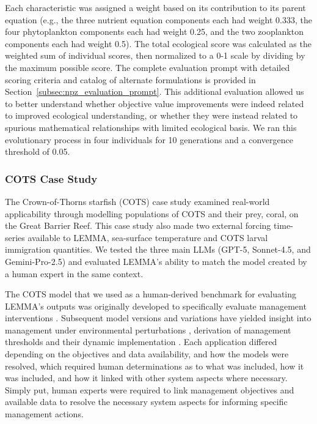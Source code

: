Each characteristic was assigned a weight based on its contribution to its parent equation (e.g., the three nutrient equation components each had weight 0.333, the four phytoplankton components each had weight 0.25, and the two zooplankton components each had weight 0.5). The total ecological score was calculated as the weighted sum of individual scores, then normalized to a 0-1 scale by dividing by the maximum possible score. The complete evaluation prompt with detailed scoring criteria and catalog of alternate formulations is provided in Section~\ref{subsec:npz_evaluation_prompt}. This additional evaluation allowed us to better understand whether objective value improvements were indeed related to improved ecological understanding, or whether they were instead related to spurious mathematical relationships with limited ecological basis. We ran this evolutionary process in four individuals for 10 generations and a convergence threshold of 0.05.

\subsubsection{COTS Case Study}

The Crown-of-Thorns starfish (COTS) case study examined real-world applicability through modelling populations of COTS and their prey, coral, on the Great Barrier Reef. This case study also made two external forcing time-series available to LEMMA, sea-surface temperature and COTS larval immigration quantities. We tested the three main LLMs (GPT-5, Sonnet-4.5, and Gemini-Pro-2.5) and evaluated LEMMA's ability to match the model created by a human expert in the same context.

The COTS model that we used as a human-derived benchmark for evaluating LEMMA's outputs was originally developed to specifically evaluate management interventions \citep{morello2014model}. Subsequent model versions and variations have yielded insight into management under environmental perturbations \citep{Rogers_Plaganyi_2022,Condie_Anthony_Babcock_Baird_Beeden_Fletcher_Gorton_Harrison_Hobday_Plaganyi_et_al_2021}, derivation of management thresholds \citep{plaganyi2020ecological,rogers2024validating} and their dynamic implementation \citep{rogers2023improving}. Each application differed depending on the objectives and data availability, and how the models were resolved, which required human determinations as to what was included, how it was included, and how it linked with other system aspects where necessary. Simply put, human experts were required to link management objectives and available data to resolve the necessary system aspects for informing specific management actions. 

